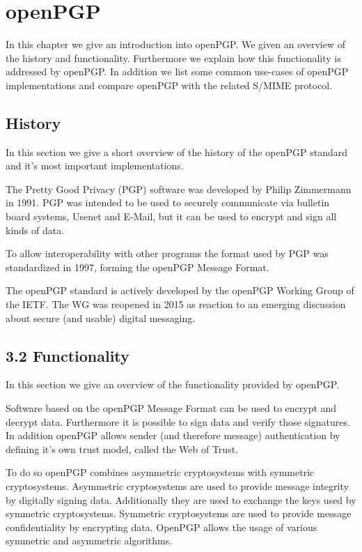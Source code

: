 \chapter{openPGP} \label{chapter:openpgp}

In this chapter we give an introduction into openPGP. We given an overview of the history and functionality. Furthermore we explain how this functionality is addressed by openPGP. In addition we list some common use-cases of openPGP implementations and compare openPGP with the related S/MIME protocol.


\section{History}

In this section we give a short overview of the history of the openPGP standard and it's most important implementations. 


The Pretty Good Privacy (PGP) software was developed by Philip Zimmermann in 1991.  PGP was intended to be used to securely communicate via bulletin board systems, Usenet and E-Mail, but it can be used to encrypt and sign all kinds of data.

To allow interoperability with other programs the format used by PGP was standardized in 1997, forming the openPGP Message Format. 


The openPGP standard is actively developed by the openPGP Working Group of the IETF. The WG was reopened in 2015 as reaction to an emerging discussion about secure (and usable) digital messaging.

\section{3.2 Functionality} \label{section:openpgp:functionality}

In this section we give an overview of the functionality provided by openPGP. 


Software based on the openPGP Message Format can be used to encrypt and decrypt data. Furthermore it is possible to sign data and verify those signatures. In addition openPGP allows sender (and therefore message) authentication by defining it's own trust model, called the Web of Trust. 

To do so openPGP combines asymmetric cryptosystems with symmetric cryptosystems. Asymmetric cryptosystems are used to provide message integrity by digitally signing data. Additionally they are used to exchange the keys used by symmetric cryptosystems. Symmetric cryptosystems are used to provide message confidentiality by encrypting data. OpenPGP allows the usage of various symmetric and asymmetric algorithms. 


